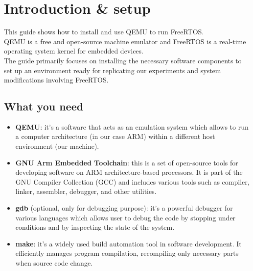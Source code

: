 \section{Introduction \& setup}
This guide shows how to install and use QEMU to run FreeRTOS.
\\QEMU is a free and open-source machine emulator and FreeRTOS is a real-time operating system kernel for embedded devices.
\\The guide primarily focuses on installing the necessary software components to set up an environment ready for replicating our experiments and system modifications involving FreeRTOS.

\subsection{What you need}

\begin{itemize}

    
    \item \textbf{QEMU}: it's a software that acts as an emulation system which allows to run a computer architecture (in our case ARM) within a different host environment (our machine).

    \item \textbf{GNU Arm Embedded Toolchain}: this is a set of open-source tools for developing software on ARM architecture-based processors. It is part of the GNU Compiler Collection (GCC) and includes various tools such as compiler, linker, assembler, debugger, and other utilities. 

    \item \textbf{gdb} (optional, only for debugging purpose): it's a powerful debugger for various languages which allows user to debug the code by stopping under conditions and by inspecting the state of the system.

    \item \textbf{make}: it's a widely used build automation tool in software development. It efficiently manages program compilation, recompiling only necessary parts when source code change. 

  \end{itemize}  

